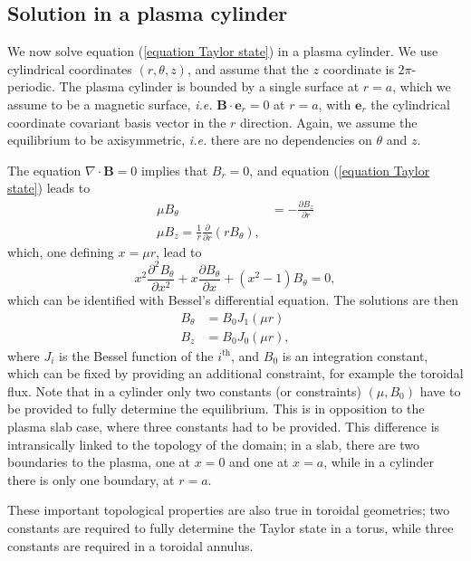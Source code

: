\documentclass[my_thesis.tex]{subfiles}
\begin{document}
\subsection{Solution in a plasma cylinder}
We now solve equation (\ref{equation Taylor state}) in a plasma cylinder. We use cylindrical coordinates $(r,\theta,z)$, and assume that the $z$ coordinate is $2\pi$-periodic. The plasma cylinder is bounded by a single surface at $r=a$, which we assume to be a magnetic surface,  \textit{i.e.} $\mathbf{B}\cdot\mathbf{e}_r=0$ at $r=a$, with $\mathbf{e}_r$ the cylindrical coordinate covariant basis vector in the $r$ direction. Again, we assume the equilibrium to be axisymmetric, \textit{i.e.} there are no dependencies on $\theta$ and $z$.

The equation $\nabla\cdot\mathbf{B}=0$ implies that $B_r=0$, and equation (\ref{equation Taylor state}) leads to
\begin{align}
	\mu B_\theta &= -\frac{\partial B_z}{\partial r}\\
	\mu B_z = \frac{1}{r}\frac{\partial}{\partial r}(rB_\theta),
\end{align}
which, one defining $x=\mu r$, lead to 
\begin{equation}
	x^2 \frac{\partial^2 B_\theta}{\partial x^2} + x \frac{\partial B_\theta}{\partial x} + (x^2-1) B_\theta = 0,
\end{equation}
which can be identified with Bessel's differential equation. The solutions are then
\begin{align}
	B_\theta &= B_0 J_1(\mu r)\\
	B_z &= B_0 J_0(\mu r),
\end{align}
where $J_i$ is the Bessel function of the $i^{\text{th}}$, and $B_0$ is an integration constant, which can be fixed by providing an additional constraint, for example the toroidal flux. Note that in a cylinder only two constants (or constraints) $(\mu,B_0)$ have to be provided to fully determine the equilibrium. This is in opposition to the plasma slab case, where three constants had to be provided. This difference is intransically linked to the topology of the domain; in a slab, there are two boundaries to the plasma, one at $x=0$ and one at $x=a$, while in a cylinder there is only one boundary, at $r=a$. 

These important topological properties are also true in toroidal geometries; two constants are required to fully determine the Taylor state in a torus, while three constants are required in a toroidal annulus.
\end{document}
